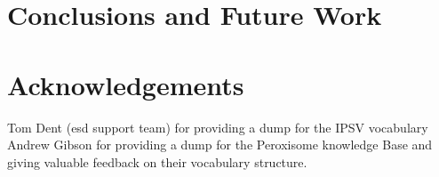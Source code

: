 \section{Conclusions and Future Work}\label{sec:conclusions}



\section{Acknowledgements}
Tom Dent (esd support team) for providing a dump for the IPSV vocabulary
Andrew Gibson for providing a dump for the Peroxisome knowledge Base and giving valuable feedback on their vocabulary structure.
